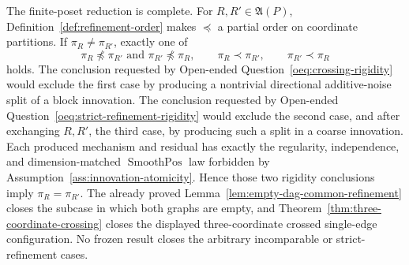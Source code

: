The finite-poset reduction is complete.  For \(R,R'\in\mathfrak A(P)\), Definition~\ref{def:refinement-order} makes \(\preceq\) a partial order on coordinate partitions.  If \(\pi_R\ne\pi_{R'}\), exactly one of
\[
 \pi_R\not\preceq\pi_{R'}\text{ and }\pi_{R'}\not\preceq\pi_R,
 \qquad \pi_R\prec\pi_{R'},
 \qquad \pi_{R'}\prec\pi_R
\]
holds.  The conclusion requested by Open-ended Question~\ref{oeq:crossing-rigidity} would exclude the first case by producing a nontrivial directional additive-noise split of a block innovation.  The conclusion requested by Open-ended Question~\ref{oeq:strict-refinement-rigidity} would exclude the second case, and after exchanging \(R,R'\), the third case, by producing such a split in a coarse innovation.  Each produced mechanism and residual has exactly the regularity, independence, and dimension-matched \(\operatorname{SmoothPos}\) law forbidden by Assumption~\ref{ass:innovation-atomicity}.  Hence those two rigidity conclusions imply \(\pi_R=\pi_{R'}\).  The already proved Lemma~\ref{lem:empty-dag-common-refinement} closes the subcase in which both graphs are empty, and Theorem~\ref{thm:three-coordinate-crossing} closes the displayed three-coordinate crossed single-edge configuration.  No frozen result closes the arbitrary incomparable or strict-refinement cases.